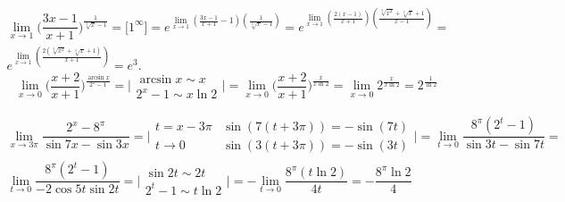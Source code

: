 $$
\begin{array}{l}
\lim\limits_{x\rightarrow1}\biggl(\dfrac{3x-1}{x+1}\biggr)^{\frac{1}{\sqrt[3]{x}-1}} = 
\biggl[1^\infty\biggr] = 
e^{\lim\limits_{x\rightarrow1}(\frac{3x-1}{x+1}-1)(\frac{1}{\sqrt[3]{x}-1})} = 
e^{\lim\limits_{x\rightarrow1}(\frac{2(x-1)}{x+1})(\frac{\sqrt[3]{x^2}+\sqrt[3]{x}+1}{x-1})} = \\
e^{\lim\limits_{x\rightarrow1}(\frac{2(\sqrt[3]{x^2}+\sqrt[3]{x}+1)}{x+1})} = 
e^{3}.
\end{array}
$$
$$
\lim\limits_{x\rightarrow0}\biggl(\dfrac{x+2}{x+1}\biggr)^{\frac{\arcsin{x}}{2^x-1}} = 
\biggl|
\begin{array}{l}
\arcsin{x} \sim x	\\ 
2^x-1 \sim x\ln{2}
\end{array}
\biggr| =
\lim\limits_{x\rightarrow0}\biggl(\dfrac{x+2}{x+1}\biggr)^{\frac{x}{x\ln{2}}} = 
\lim\limits_{x\rightarrow0}2^{\frac{x}{x\ln{2}}} = 
2^{\frac{1}{\ln{2}}}
$$

$$
\begin{array}{l}
\lim\limits_{x\rightarrow3\pi}\dfrac{2^x-8^\pi}{\sin{7x}-\sin{3x}} = 
\biggl|
\begin{array}{ll}
t = x - 3\pi & \sin(7(t+3\pi)) = -\sin(7t)	\\ 
t\rightarrow0 & \sin(3(t+3\pi)) = -\sin(3t)
\end{array}
\biggr| =
\lim\limits_{t\rightarrow0}\dfrac{8^\pi(2^t-1)}{\sin{3t}-\sin{7t}} = \\
\lim\limits_{t\rightarrow0}\dfrac{8^\pi(2^t-1)}{-2\cos{5t}\sin{2t}}
= \biggl|
\begin{array}{l}
\sin{2t} \sim 2t	\\ 
2^t-1 \sim t\ln{2}
\end{array}
\biggr| =
- \lim\limits_{t\rightarrow0}\dfrac{8^\pi(t\ln{2})}{4t} = 
-\dfrac{8^\pi\ln2}{4}
\end{array}
$$


